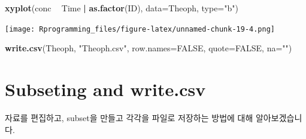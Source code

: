 \documentclass[10pt,]{krantz}
\makeatletter
\newenvironment{Shaded}{\begin{snugshade}}{\end{snugshade}}
\newcommand{\KeywordTok}[1]{\textcolor[rgb]{0.13,0.29,0.53}{\textbf{#1}}}
\newcommand{\DataTypeTok}[1]{\textcolor[rgb]{0.13,0.29,0.53}{#1}}
\newcommand{\StringTok}[1]{\textcolor[rgb]{0.31,0.60,0.02}{#1}}
\newcommand{\OtherTok}[1]{\textcolor[rgb]{0.56,0.35,0.01}{#1}}
\newcommand{\OperatorTok}[1]{\textcolor[rgb]{0.81,0.36,0.00}{\textbf{#1}}}
\newcommand{\NormalTok}[1]{#1}
\newenvironment{kframe}{%
\medskip{}
\setlength{\fboxsep}{.8em}
 \def\at@end@of@kframe{}%
 \ifinner\ifhmode%
  \def\at@end@of@kframe{\end{minipage}}%
  \begin{minipage}{\columnwidth}%
 \fi\fi%
 \def\FrameCommand##1{\hskip\@totalleftmargin \hskip-\fboxsep
 \colorbox{shadecolor}{##1}\hskip-\fboxsep
     \hskip-\linewidth \hskip-\@totalleftmargin \hskip\columnwidth}%
 \MakeFramed {\advance\hsize-\width
   \@totalleftmargin\z@ \linewidth\hsize
   \@setminipage}}%
 {\par\unskip\endMakeFramed%
 \at@end@of@kframe}
\renewenvironment{Shaded}{\begin{kframe}}{\end{kframe}}
\theoremstyle{definition}
\theoremstyle{definition}
\theoremstyle{remark}
\makeatother
\begin{document}
\begin{Shaded}
\begin{Highlighting}[]

\KeywordTok{xyplot}\NormalTok{(conc }\OperatorTok{~}\StringTok{ }\NormalTok{Time }\OperatorTok{|}\StringTok{ }\KeywordTok{as.factor}\NormalTok{(ID), }\DataTypeTok{data=}\NormalTok{Theoph, }\DataTypeTok{type=}\StringTok{"b"}\NormalTok{)}
\end{Highlighting}
\end{Shaded}

\texttt{[image: Rprogramming\_files/figure-latex/unnamed-chunk-19-4.png]}

\begin{Shaded}
\begin{Highlighting}[]

\KeywordTok{write.csv}\NormalTok{(Theoph, }\StringTok{"Theoph.csv"}\NormalTok{, }\DataTypeTok{row.names=}\OtherTok{FALSE}\NormalTok{, }\DataTypeTok{quote=}\OtherTok{FALSE}\NormalTok{, }\DataTypeTok{na=}\StringTok{""}\NormalTok{)}
\end{Highlighting}
\end{Shaded}

\section{Subseting and write.csv}\label{subseting-and-write.csv}

자료를 편집하고, subset을 만들고 각각을 파일로 저장하는 방법에 대해
알아보겠습니다.
\end{document}
